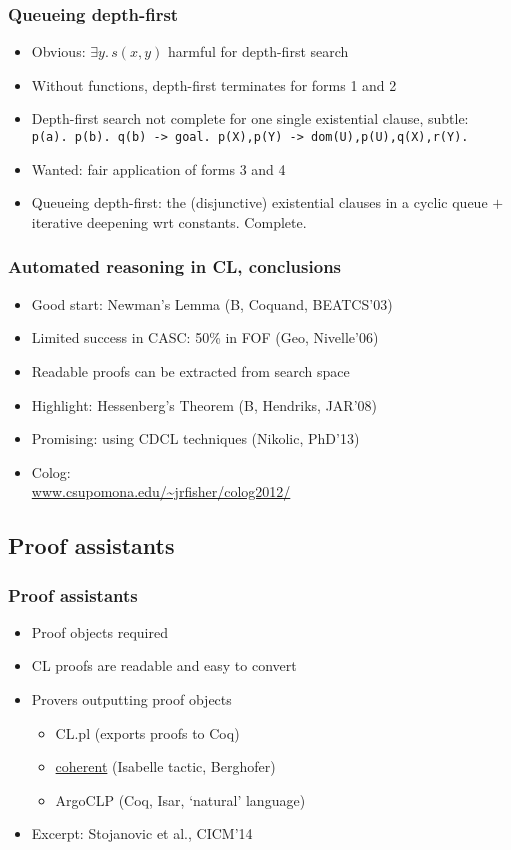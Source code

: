 \documentclass[handout,11pt]{beamer}
\begin{document}
\begin{frame}
\frametitle{Queueing depth-first}
 \begin{itemize}[<+->]
    \item Obvious: $\exists y.\,s(x,y)$ harmful for depth-first search
    \item Without functions, depth-first terminates for forms 1 and 2
    \item Depth-first search not complete for \alert{one single existential} clause, subtle:
\texttt{  p(a). p(b). q(b) -> goal. p(X),p(Y) -> dom(U),p(U),q(X),r(Y).}
    \item Wanted: fair application of forms 3 and 4 
    \item Queueing depth-first: the (disjunctive) existential clauses
          in a cyclic queue $+$ iterative deepening wrt constants. Complete.
 \end{itemize}
\end{frame}

\begin{frame}
\frametitle{Automated reasoning in CL, conclusions}
 \begin{itemize}[<+->]
   \item Good start: Newman's Lemma (B, Coquand, BEATCS'03)
   \item Limited success in CASC: 50\% in FOF (Geo, Nivelle'06)
   \item Readable proofs can be extracted from search space
   \item Highlight: Hessenberg's Theorem (B, Hendriks, JAR'08)
   \item Promising: using CDCL techniques (Nikolic, PhD'13)
    \item Colog:\\\url{www.csupomona.edu/~jrfisher/colog2012/}
 \end{itemize}
\end{frame}

\subsection{Proof assistants}

\begin{frame}
\frametitle{Proof assistants}
 \begin{itemize}[<+->]   %
    \item Proof objects \alert{required}
    \item CL proofs are readable and easy to convert
    \item Provers outputting proof objects
    \begin{itemize}
       \item CL.pl (exports proofs to Coq)
       \item \url{coherent} (Isabelle tactic, Berghofer)
       \item ArgoCLP (Coq, Isar, `natural' language)
    \end{itemize}
    \item %
                Excerpt: Stojanovic et al., CICM'14
                \href{run:/usr/bin/evince}{}
 \end{itemize}
\end{frame}
\end{document}
